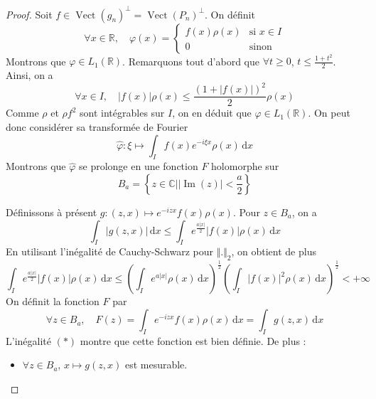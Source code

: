 	\begin{proof}
		Soit $f \in \operatorname{Vect}(g_n)^\perp = \operatorname{Vect}(P_n)^\perp$. On définit
		\[
		\forall x \in \mathbb{R}, \quad \varphi(x) = \begin{cases} f(x) \rho(x) &\text{si } x \in I \\ 0 &\text{sinon} \end{cases}
		\]
		Montrons que $\varphi \in L_1(\mathbb{R})$. Remarquons tout d'abord que $\forall t \geq 0$, $t \leq \frac{1 + t^2}{2}$. Ainsi, on a
		\[ \forall x \in I, \quad |f(x)|\rho(x) \leq \frac{(1 + |f(x)|)^2}{2} \rho(x) \]
		Comme $\rho$ et $\rho f^2$ sont intégrables sur $I$, on en déduit que $\varphi \in L_1(\mathbb{R})$. On peut donc considérer sa transformée de Fourier
		\[ \widehat{\varphi} : \xi \mapsto \int_I f(x) e^{-i \xi x} \rho(x) \, \mathrm{d}x \]
		Montrons que $\widehat{\varphi}$ se prolonge en une fonction $F$ holomorphe sur
		\[ B_a = \left\{ z \in \mathbb{C} \mid \vert \operatorname{Im}(z) \vert < \frac{a}{2} \right\} \]
		\begin{center}
		\end{center}
		Définissons à présent $g : (z, x) \mapsto e^{-izx} f(x) \rho(x)$. Pour $z \in B_a$, on a
		\[ \int_I \vert g(z, x) \vert \, \mathrm{d}x \leq \int_I e^{\frac{a \vert x \vert}{2}} \vert f(x) \vert \rho(x) \, \mathrm{d}x \]
		En utilisant l'inégalité de Cauchy-Schwarz pour $\Vert . \Vert_2$, on obtient de plus
		\[ \int_I e^{\frac{a \vert x \vert}{2}} \vert f(x) \vert \rho(x) \, \mathrm{d}x \leq \left( \int_I e^{a \vert x \vert} \rho(x) \, \mathrm{d}x \right)^{\frac{1}{2}} \left( \int_I \vert f(x) \vert^2 \rho(x) \, \mathrm{d}x \right)^{\frac{1}{2}} < + \infty \tag{$*$} \]
		On définit la fonction $F$ par
		\[ \forall z \in B_a , \quad F(z) = \int_I e^{-izx} f(x) \rho(x) \, \mathrm{d}x = \int_I g(z, x) \, \mathrm{d}x \]
		L'inégalité $(*)$ montre que cette fonction est bien définie. De plus :
		\begin{itemize}
			\item $\forall z \in B_a$, $x \mapsto g(z, x)$ est mesurable.

\end{itemize}
\end{proof}
